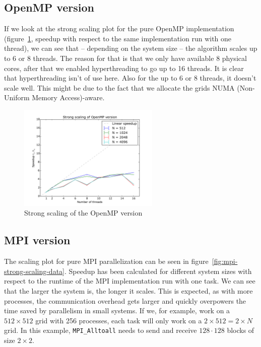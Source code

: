 \documentclass[a4paper]{article}
\begin{document}
\subsection{OpenMP version}

If we look at the strong scaling plot for the pure OpenMP implementation (figure~\ref{fig:omp-strong-scaling}, speedup with respect to the same implementation run with one thread), we can see that -- depending on the system size -- the algorithm scales up to 6 or 8 threads.
The reason for that is that we only have available 8 physical cores, after that we enabled hyperthreading to go up to 16 threads.
It is clear that hyperthreading isn't of use here.
Also for the up to 6 or 8 threads, it doesn't scale well.
This might be due to the fact that we allocate the grids NUMA (Non-Uniform Memory Access)-aware.
\begin{figure}
	\centering
	\includegraphics[width=0.6\textwidth]{omp_strong_scaling.pdf}
	\caption{Strong scaling of the OpenMP version}
	\label{fig:omp-strong-scaling}
\end{figure}



\subsection{MPI version}\label{sec:mpi-scaling}
The scaling plot for pure MPI parallelization can be seen in figure~\ref{fig:mpi-strong-scaling-data}.
Speedup has been calculated for different system sizes with respect to the runtime of the MPI implementation run with one task.
We can see that the larger the system is, the longer it scales.
This is expected, as with more processes, the communication overhead gets larger and quickly overpowers the time saved by parallelism in small systems.
If we, for example, work on a $512 \times 512$ grid with 256 processes, each task will only work on a $2 \times 512 = 2 \times N$ grid.
In this example, \verb|MPI_Alltoall| needs to send and receive $128 \cdot 128$ blocks of size $2 \times 2$.
\end{document}
